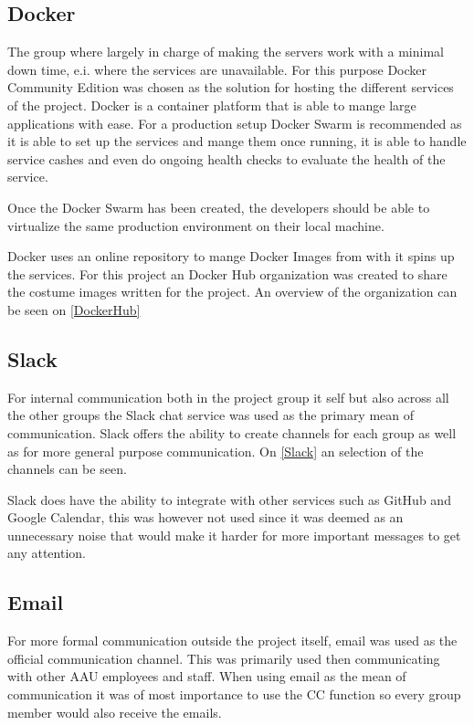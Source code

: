 

\subsection{Docker}
The group where largely in charge of making the servers work with a minimal down time, e.i. where the services are unavailable.
For this purpose Docker Community Edition was chosen as the solution for hosting the different services of the project. 
Docker is a container platform that is able to mange large applications with ease. 
For a production setup Docker Swarm is recommended as it is able to set up the services and mange them once running, it is able to handle service cashes and even do ongoing health checks to evaluate the health of the service. 

Once the Docker Swarm has been created, the developers should be able to virtualize the same production environment on their local machine. 

Docker uses an online repository to mange Docker Images from with it spins up the services. 
For this project an Docker Hub organization was created to share the costume images written for the project. 
An overview of the organization can be seen on \autoref{DockerHub}


\subsection{Slack}
For internal communication both in the project group it self but also across all the other groups the Slack chat service was used as the primary mean of communication. 
Slack offers the ability to create channels for each group as well as for more general purpose communication. 
On \autoref{Slack} an selection of the channels can be seen. 


Slack does have the ability to integrate with other services such as GitHub and Google Calendar, this was however not used since it was deemed as an unnecessary noise that would make it harder for more important messages to get any attention. 

\subsection{Email}
For more formal communication outside the project itself, email was used as the official communication channel. 
This was primarily used then communicating with other AAU employees and staff. 
When using email as the mean of communication it was of most importance to use the CC function so every group member would also receive the emails.
